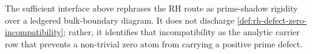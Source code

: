 \begin{principle}
\label{prin:rh-prime-shadow-interface-status}
The sufficient interface above rephrases the RH route as prime-shadow
rigidity over a ledgered bulk-boundary diagram. It does not discharge
\autoref{def:rh-defect-zero-incompatibility}; rather, it identifies that
incompatibility as the analytic carrier row that prevents a non-trivial
zero atom from carrying a positive prime defect.
\end{principle}

